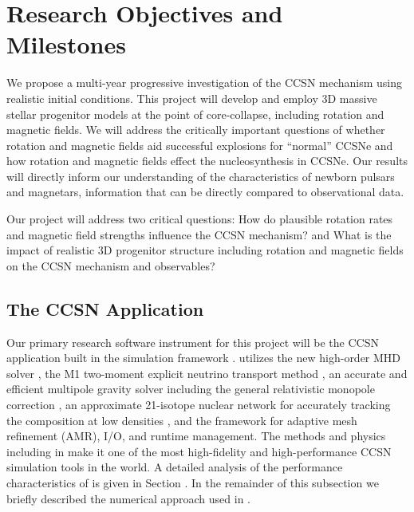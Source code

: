 \section{Research Objectives and Milestones}
\label{sec:objectives}

We propose a multi-year progressive investigation of the CCSN mechanism using realistic initial conditions.
This project will develop and employ 3D massive stellar progenitor models at the point of core-collapse, including rotation and magnetic fields.
We will address the critically important questions of whether rotation and magnetic fields aid successful explosions for ``normal'' CCSNe and how rotation and magnetic fields effect the nucleosynthesis in CCSNe.
Our results will directly inform our understanding of the characteristics of newborn pulsars and magnetars, information that can be directly compared to observational data.

Our project will address two critical questions: How do plausible rotation rates and magnetic field strengths influence the CCSN mechanism? and What is the impact of realistic 3D progenitor structure including rotation and magnetic fields on the CCSN mechanism and observables?

\subsection{The \sparkmone CCSN Application}

Our primary research software instrument for this project will be the \sparkmone CCSN application built in the \flash simulation framework \citep{Fryxell:2000, Dubey:2009}.
\sparkmone utilizes the new \spark high-order MHD solver \citep{Couch:2017}, the M1 two-moment explicit neutrino transport method \citep{Kuroda:2012, OConnor:2015, OConnor:2015a}, an accurate and efficient multipole gravity solver \citep{Couch:2013c} including the general relativistic monopole correction \citep{Marek:2006}, an approximate 21-isotope nuclear network for accurately tracking the composition at low densities \citep{Couch:2015a}, and the \flash framework for adaptive mesh refinement (AMR), I/O, and runtime management.
The methods and physics including in \sparkmone make it one of the most high-fidelity and high-performance CCSN simulation tools in the world.
A detailed analysis of the performance characteristics of \sparkmone is given in Section .
In the remainder of this subsection we briefly described the numerical approach used in \sparkmone.

